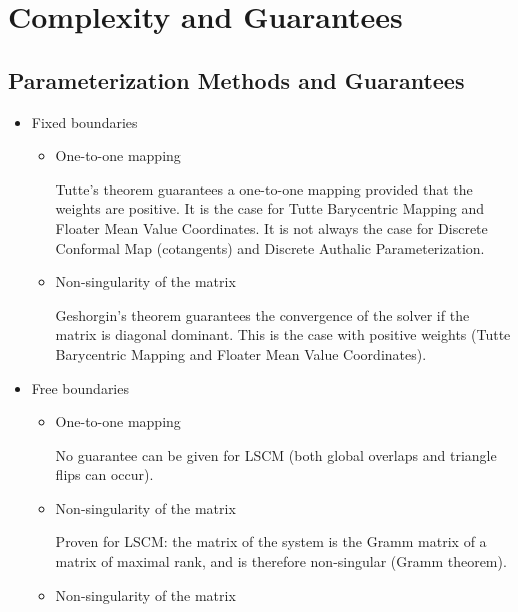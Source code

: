 \section{Complexity and Guarantees}


\subsection{Parameterization Methods and Guarantees}

\begin{itemize}

\item Fixed boundaries

    \begin{itemize}

    \item One-to-one mapping

        Tutte's theorem guarantees a one-to-one mapping provided that the weights are positive.
        It is the case for Tutte Barycentric Mapping and Floater Mean Value Coordinates.
        It is not always the case for Discrete Conformal Map (cotangents) and
        Discrete Authalic Parameterization.

    \item Non-singularity of the matrix

        Geshorgin's theorem guarantees the convergence of the solver if the matrix is diagonal dominant.
        This is the case with positive weights (Tutte Barycentric Mapping and Floater Mean Value
        Coordinates).

    \end{itemize}

\item Free boundaries

    \begin{itemize}

    \item One-to-one mapping

        No guarantee can be given for LSCM (both global overlaps and triangle flips can
        occur).

    \item Non-singularity of the matrix

        Proven for LSCM: the matrix of the system is the Gramm matrix of a matrix of maximal rank,
        and is therefore non-singular (Gramm theorem).

    \item Non-singularity of the matrix

    \end{itemize}

\end{itemize}


